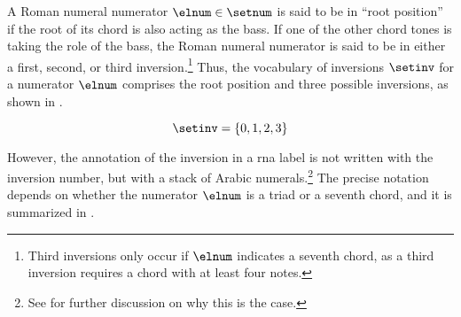 
A Roman numeral numerator $\elnum \in \setnum$ is said to be
in ``root position'' if the root of its chord is also acting
as the bass. If one of the other chord tones is taking the
role of the bass, the Roman numeral numerator is said to be
in either a first, second, or third
inversion.\footnote{Third inversions only occur if $\elnum$
indicates a seventh chord, as a third inversion requires a
chord with at least four notes.} Thus, the vocabulary of
inversions $\setinv$ for a numerator $\elnum$ comprises the
root position and three possible inversions, as shown in
.

\begin{equation}
    \label{eq:inversion_vocabulary}
    \setinv = \{ 0, 1, 2, 3 \}
\end{equation}

However, the annotation of the inversion in a \gls{rna}
label is not written with the inversion number, but with a
stack of Arabic numerals.\footnote{See
 for further
discussion on why this is the case.} The precise notation
depends on whether the numerator $\elnum$ is a triad or a
seventh chord, and it is summarized in .

